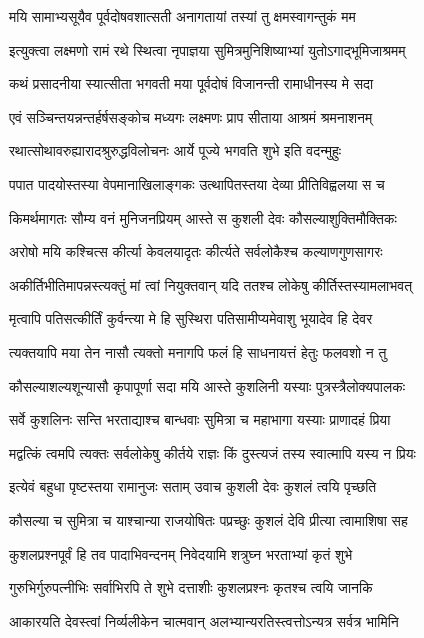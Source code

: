 \twolineshloka
{मयि सामाभ्यसूयैव पूर्वदोषवशात्सती}
{अनागतायां तस्यां तु क्षमस्वागन्तुकं मम}%

\twolineshloka
{इत्युक्त्वा लक्ष्मणो रामं रथे स्थित्वा नृपाज्ञया}
{सुमित्रमुनिशिष्याभ्यां युतोऽगाद्भूमिजाश्रमम्}%

\twolineshloka
{कथं प्रसादनीया स्यात्सीता भगवती मया}
{पूर्वदोषं विजानन्ती रामाधीनस्य मे सदा}%

\twolineshloka
{एवं सञ्चिन्तयन्नन्तर्हर्षसङ्कोच मध्यगः}
{लक्ष्मणः प्राप सीताया आश्रमं श्रमनाशनम्}%

\twolineshloka
{रथात्सोथावरुह्यारादश्रुरुद्धविलोचनः}
{आर्ये पूज्ये भगवति शुभे इति वदन्मुहुः}%

\twolineshloka
{पपात पादयोस्तस्या वेपमानाखिलाङ्गकः}
{उत्थापितस्तया देव्या प्रीतिविह्वलया स च}%

\twolineshloka
{किमर्थमागतः सौम्य वनं मुनिजनप्रियम्}
{आस्ते स कुशली देवः कौसल्याशुक्तिमौक्तिकः}%

\twolineshloka
{अरोषो मयि कश्चित्स कीर्त्या केवलयादृतः}
{कीर्त्यते सर्वलोकैश्च कल्याणगुणसागरः}%

\twolineshloka
{अकीर्तिभीतिमापन्नस्त्यक्तुं मां त्वां नियुक्तवान्}
{यदि ततश्च लोकेषु कीर्तिस्तस्यामलाभवत्}%

\twolineshloka
{मृत्वापि पतिसत्कीर्तिं कुर्वन्त्या मे हि सुस्थिरा}
{पतिसामीप्यमेवाशु भूयादेव हि देवर}%

\twolineshloka
{त्यक्तयापि मया तेन नासौ त्यक्तो मनागपि}
{फलं हि साधनायत्तं हेतुः फलवशो न तु}%

\twolineshloka
{कौसल्याशल्यशून्यासौ कृपापूर्णा सदा मयि}
{आस्ते कुशलिनी यस्याः पुत्रस्त्रैलोक्यपालकः}%

\twolineshloka
{सर्वे कुशलिनः सन्ति भरताद्याश्च बान्धवाः}
{सुमित्रा च महाभागा यस्याः प्राणादहं प्रिया}%

\twolineshloka
{मद्वत्किं त्वमपि त्यक्तः सर्वलोकेषु कीर्तये}
{राज्ञः किं दुस्त्यजं तस्य स्वात्मापि यस्य न प्रियः}%

\twolineshloka
{इत्येवं बहुधा पृष्टस्तया रामानुजः सताम्}
{उवाच कुशली देवः कुशलं त्वयि पृच्छति}%

\twolineshloka
{कौसल्या च सुमित्रा च याश्चान्या राजयोषितः}
{पप्रच्छुः कुशलं देवि प्रीत्या त्वामाशिषा सह}%

\twolineshloka
{कुशलप्रश्नपूर्वं हि तव पादाभिवन्दनम्}
{निवेदयामि शत्रुघ्न भरताभ्यां कृतं शुभे}%

\twolineshloka
{गुरुभिर्गुरुपत्नीभिः सर्वाभिरपि ते शुभे}
{दत्ताशीः कुशलप्रश्नः कृतश्च त्वयि जानकि}%

\twolineshloka
{आकारयति देवस्त्वां निर्व्यलीकेन चात्मवान्}
{अलभ्यान्यरतिस्त्वत्तोऽन्यत्र सर्वत्र भामिनि}%

